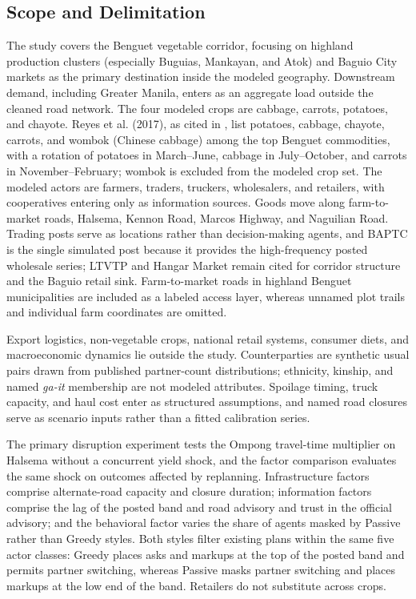 \documentclass{icsthesis}
\begin{document}
\begin{mainmatter}
			\subsection{Scope and Delimitation}

			The study covers the Benguet vegetable corridor, focusing on highland production clusters (especially Buguias, Mankayan, and Atok) and Baguio City markets as the primary destination inside the modeled geography. Downstream demand, including Greater Manila, enters as an aggregate load outside the cleaned road network. The four modeled crops are cabbage, carrots, potatoes, and chayote. Reyes et al. (2017), as cited in \citet{deGuzmanBambicoBaconguis2023}, list potatoes, cabbage, chayote, carrots, and wombok (Chinese cabbage) among the top Benguet commodities, with a rotation of potatoes in March--June, cabbage in July--October, and carrots in November--February; wombok is excluded from the modeled crop set. The modeled actors are farmers, traders, truckers, wholesalers, and retailers, with cooperatives entering only as information sources. Goods move along farm-to-market roads, Halsema, Kennon Road, Marcos Highway, and Naguilian Road. Trading posts serve as locations rather than decision-making agents, and BAPTC is the single simulated post because it provides the high-frequency posted wholesale series; LTVTP and Hangar Market remain cited for corridor structure and the Baguio retail sink. Farm-to-market roads in highland Benguet municipalities are included as a labeled access layer, whereas unnamed plot trails and individual farm coordinates are omitted.

			Export logistics, non-vegetable crops, national retail systems, consumer diets, and macroeconomic dynamics lie outside the study. Counterparties are synthetic usual pairs drawn from published partner-count distributions; ethnicity, kinship, and named \emph{ga-it} membership are not modeled attributes. Spoilage timing, truck capacity, and haul cost enter as structured assumptions, and named road closures serve as scenario inputs rather than a fitted calibration series.

			The primary disruption experiment tests the Ompong travel-time multiplier on Halsema without a concurrent yield shock, and the factor comparison evaluates the same shock on outcomes affected by replanning. Infrastructure factors comprise alternate-road capacity and closure duration; information factors comprise the lag of the posted band and road advisory and trust in the official advisory; and the behavioral factor varies the share of agents masked by Passive rather than Greedy styles. Both styles filter existing plans within the same five actor classes: Greedy places asks and markups at the top of the posted band and permits partner switching, whereas Passive masks partner switching and places markups at the low end of the band. Retailers do not substitute across crops.


\end{mainmatter}
\end{document}
